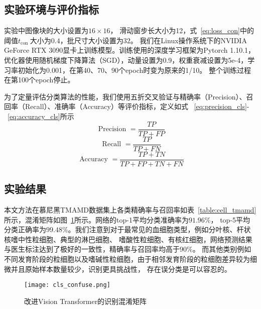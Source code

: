 \subsection{实验环境与评价指标}
实验中图像块的大小设置为$16 \times 16$，
滑动窗步长大小为12，式~\ref{eq:loss_con}中的阈值$t_{\text {con }}$大小为$0.4$，批尺寸大小设置为$32$。
我们在Linux操作系统下的NVIDIA GeForce RTX 3090显卡上训练模型。训练使用的深度学习框架为Pytorch 1.10.1，
优化器使用随机梯度下降算法（SGD），动量设置为0.9，权重衰减设置为5e-4，学习率初始化为0.001，在第40、70、90个epoch时变为原来的1/10。
整个训练过程在第100个epoch停止。

为了定量评估分类算法的性能，我们使用五折交叉验证与精确率（Precision）、召回率（Recall）、准确率（Accuracy）等评价指标，定义如式
~\ref{eq:precision_cls}-~\ref{eq:accuracy_cls}所示
\begin{equation}
  \text { Precision }=\frac{T P}{T P+F P}
  \label{eq:precision_cls}
\end{equation}
\begin{equation}
  \text { Recall }=\frac{T P}{T P+F N}
  \label{eq:recall_cls}
\end{equation}
\begin{equation}
  \text { Accuracy }=\frac{T P+T N}{T P+F P+T N+F N}
  \label{eq:accuracy_cls}
\end{equation}

\subsection{实验结果}

本文方法在慕尼黑TMAMD数据集上各类精确率与召回率如表~\ref{table:cell_tmamd}所示，混淆矩阵如图~\ref{fig:cls_confuse}所示。网络的top-1平均分类准确率为$91.96\%$，
top-5平均分类正确率为$99.48\%$。我们注意到对于最常见的血细胞类型，例如分叶核、杆状核嗜中性粒细胞、典型的淋巴细胞、
嗜酸性粒细胞、有核红细胞，网络预测结果与医生标注达到了极好的一致性，精确率与召回率均高于$90\%$。
而其他类别例如不同发育阶段的粒细胞以及嗜碱性粒细胞，由于相邻发育阶段的粒细胞差异较为细微并且原始样本数量较少，识别更具挑战性，
存在误分类是可以容忍的。
\begin{figure}[htbp]
   \centering   
   \texttt{[image: cls\_confuse.png]}   
   \caption{改进Vision Transformer的识别混淆矩阵}   
   \label{fig:cls_confuse} 
\end{figure}  

